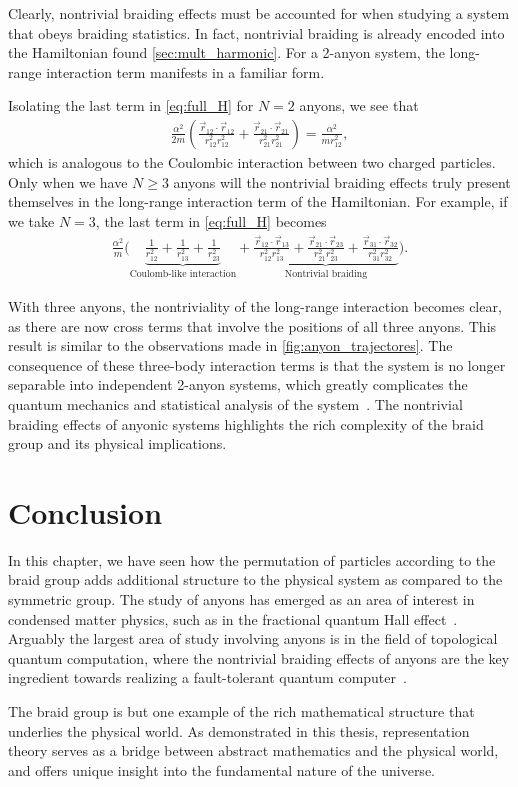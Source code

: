 Clearly, nontrivial braiding effects must be accounted for when studying a system that obeys braiding statistics. In fact, nontrivial braiding is already encoded into the Hamiltonian found \cref{sec:mult_harmonic}. For a 2-anyon system, the long-range interaction term manifests in a familiar form. 

Isolating the last term in \cref{eq:full_H} for $N=2$ anyons, we see that
\begin{align}
    \frac{\alpha^2}{2m}\left( \frac{\vec{r}_{12}\cdot\vec{r}_{12}}{r_{12}^2r_{12}^2} + \frac{\vec{r}_{21}\cdot\vec{r}_{21}}{r_{21}^2r_{21}^2} \right)  = \frac{\alpha^2}{mr_{12}^2},
\end{align}
which is analogous to the Coulombic interaction between two charged particles.
Only when we have $N\geq 3$ anyons will the nontrivial braiding effects truly present themselves in the long-range interaction term of the Hamiltonian. For example, if we take $N=3$, the last term in \cref{eq:full_H} becomes
\begin{align}
    \frac{\alpha^2}{m}\biggl( \underbrace{\frac{1}{r_{12}^2} + \frac{1}{r_{13}^2} + \frac{1}{r_{23}^2}}_{\textrm{Coulomb-like interaction}} + \underbrace{\frac{\vec{r}_{12}\cdot\vec{r}_{13}}{r_{12}^2r_{13}^2} + \frac{\vec{r}_{21}\cdot\vec{r}_{23}}{r_{21}^2r_{23}^2} + \frac{\vec{r}_{31}\cdot\vec{r}_{32}}{r_{31}^2r_{32}^2}}_\textrm{Nontrivial braiding} \biggr).
\end{align}

With three anyons, the nontriviality of the long-range interaction becomes clear, as there are now cross terms that involve the positions of all three anyons. This result is similar to the observations made in \cref{fig:anyon_trajectores}. The consequence of these three-body interaction terms is that the system is no longer separable into independent 2-anyon systems, which greatly complicates the quantum mechanics and statistical analysis of the system~\cite{Khare2005}. The nontrivial braiding effects of anyonic systems highlights the rich complexity of the braid group and its physical implications.

\section{Conclusion}

In this chapter, we have seen how the permutation of particles according to the braid group adds additional structure to the physical system as compared to the symmetric group. The study of anyons has emerged as an area of interest in condensed matter physics, such as in the fractional quantum Hall effect~\cite{Bolotin2009}. Arguably the largest area of study involving anyons is in the field of topological quantum computation, where the nontrivial braiding effects of anyons are the key ingredient towards realizing a fault-tolerant quantum computer~\cite{Bernard2018,Delaney2016}.

The braid group is but one example of the rich mathematical structure that underlies the physical world. As demonstrated in this thesis, representation theory serves as a bridge between abstract mathematics and the physical world, and offers unique insight into the fundamental nature of the universe.